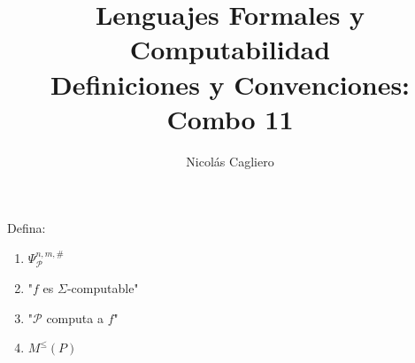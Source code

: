 \documentclass{article}
\title{Lenguajes Formales y Computabilidad \\
        \large Definiciones y Convenciones: Combo 11 }
\author{Nicolás Cagliero}
\begin{document}
\maketitle

Defina:

\begin{enumerate}
    \item $\Psi_{\mathcal{P}}^{n, m, \#} $

    \item "$f$ es $\Sigma$-computable"
    
    \item "$\mathcal{P}$ computa a $f$"
    
    \item $M^{\leq}(P)$
\end{enumerate}
\end{document}
